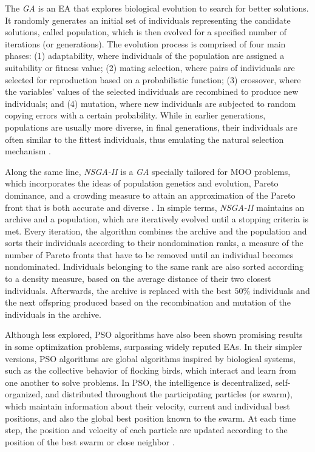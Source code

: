 The \textit{\ac{GA}} is an \ac{EA} that explores biological evolution to search for better solutions. It randomly generates an initial set of individuals representing the candidate solutions, called population, which is then evolved for a specified number of iterations (or generations). The evolution process is comprised of four main phases: (1) adaptability, where individuals of the population are assigned a suitability or fitness value; (2) mating selection, where pairs of individuals are selected for reproduction based on a probabilistic function; (3) crossover, where the variables' values of the selected individuals are recombined to produce new individuals; and (4) mutation, where new individuals are subjected to random copying errors with a certain probability. While in earlier generations, populations are usually more diverse, in final generations, their individuals are often similar to the fittest individuals, thus emulating the natural selection mechanism \cite{Glover2003Metaheuristics}.

Along the same line, \textit{\ac{NSGA-II}} is a \textit{\ac{GA}} specially tailored for \ac{MOO} problems, which incorporates the ideas of population genetics and evolution, Pareto dominance, and a crowding measure to attain an approximation of the Pareto front that is both accurate and diverse \cite{Deb2002}. In simple terms, \textit{\ac{NSGA-II}} maintains an archive and a population, which are iteratively evolved until a stopping criteria is met. Every iteration, the algorithm combines the archive and the population and sorts their individuals according to their nondomination ranks, a measure of the number of Pareto fronts that have to be removed until an individual becomes nondominated. Individuals belonging to the same rank are also sorted according to a density measure, based on the average distance of their two closest individuals. Afterwards, the archive is replaced with the best $50\%$ individuals and the next offspring produced based on the recombination and mutation of the individuals in the archive.

Although less explored, \ac{PSO} algorithms have also been shown promising results in some optimization problems, surpassing widely reputed \acp{EA}. In their simpler versions, \ac{PSO} algorithms are global algorithms inspired by biological systems, such as the collective behavior of flocking birds, which interact and learn from one another to solve problems. In \ac{PSO}, the intelligence is decentralized, self-organized, and distributed throughout the participating particles (or swarm), which maintain information about their velocity, current and individual best positions, and also the global best position known to the swarm. At each time step, the position and velocity of each particle are updated according to the position of the best swarm or close neighbor \cite{Glover2003Metaheuristics}.
	
